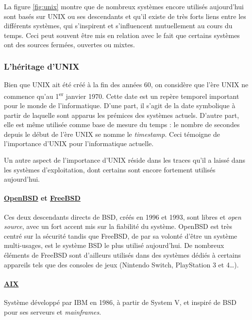 La figure \ref{fig:unix} montre que de nombreux systèmes encore utilisés aujourd'hui sont basés sur UNIX ou ses descendants et qu'il existe de très forts liens entre les différents systèmes, qui s'inspirent et s'influencent mutuellement au cours du temps. Ceci peut souvent être mis en relation avec le fait que certains systèmes ont des sources fermées, ouvertes ou mixtes.

\newpage

\subsubsection{L'héritage d'UNIX}

Bien que UNIX ait été créé à la fin des années 60, on considère que l'ère UNIX ne commence qu'au 1\textsuperscript{er} janvier 1970. Cette date est un repère temporel important pour le monde de l'informatique. D'une part, il s'agit de la date symbolique à partir de laquelle sont apparus les prémices des systèmes actuels. D'autre part, elle est même utilisée comme base de mesure du temps : le nombre de secondes depuis le début de l'ère UNIX se nomme le \textit{timestamp}. Ceci témoigne de l'importance d'UNIX pour l'informatique actuelle.

Un autre aspect de l'importance d'UNIX réside dans les traces qu'il a laissé dans les systèmes d'exploitation, dont certains sont encore fortement utilisés aujourd'hui.

\paragraph{\href{https://www.openbsd.org}{OpenBSD} et \href{https://www.freebsd.org}{FreeBSD}}
Ces deux descendants directs de BSD, créés en 1996 et 1993, sont libres et \textit{open source}, avec un fort accent mis sur la fiabilité du système. OpenBSD est très centré sur la sécurité tandis que FreeBSD, de par sa volonté d'être un système multi-usages, est le système BSD le plus utilisé aujourd'hui. De nombreux éléments de FreeBSD sont d'ailleurs utilisés dans des systèmes dédiés à certains appareils tels que des consoles de jeux (Nintendo Switch, PlayStation 3 et 4\dots).

\paragraph{\href{https://www.ibm.com/power/operating-systems/aix}{AIX}}
Système développé par IBM en 1986, à partir de System V, et inspiré de BSD pour ses serveurs et \textit{mainframes}.

